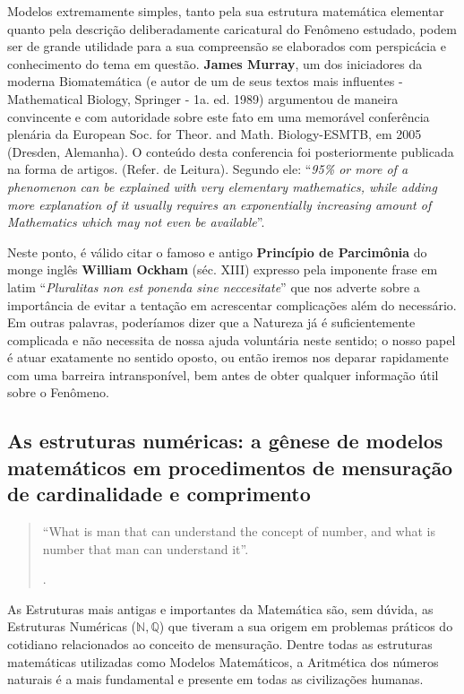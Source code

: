     Modelos extremamente simples, tanto pela sua estrutura matemática elementar quanto pela descrição deliberadamente caricatural do Fenômeno estudado, podem ser de grande utilidade para a sua compreensão se elaborados com perspicácia e conhecimento do tema em questão. \textbf{James Murray}, um dos iniciadores da moderna Biomatemática (e autor de um de seus textos mais influentes - Mathematical Biology, Springer - 1a. ed. 1989) argumentou de maneira convincente e com autoridade sobre este fato em uma memorável conferência plenária da European Soc. for Theor. and Math. Biology-ESMTB, em 2005 (Dresden, Alemanha). O conteúdo desta conferencia foi posteriormente publicada na forma de artigos. (Refer. de Leitura). Segundo ele: ``\textit{95\% or more of a phenomenon can be explained with very elementary mathematics, while adding more explanation of it usually requires an exponentially increasing amount of Mathematics which may not even be available}''.

    Neste ponto, é válido citar o famoso e antigo \textbf{Princípio de Parcimônia} do monge inglês \textbf{William Ockham} (séc. XIII) expresso pela imponente frase em latim ``\textit{Pluralitas non est ponenda sine neccesitate}'' que nos adverte sobre a importância de evitar a tentação em acrescentar complicações além do necessário. Em outras palavras, poderíamos dizer que a Natureza já é suficientemente complicada e não necessita de nossa ajuda voluntária neste sentido; o nosso papel é atuar exatamente no sentido oposto, ou então iremos nos deparar rapidamente com uma barreira intransponível, bem antes de obter qualquer informação útil sobre o Fenômeno.


\subsection{As estruturas numéricas: a gênese de modelos matemáticos em procedimentos de mensuração de cardinalidade e comprimento}

\begin{quote}
    ``What is man that can understand the concept of number, and what is number that man can understand it''.

    .
\end{quote}


    As Estruturas mais antigas e importantes da Matemática são, sem dúvida, as Estruturas Numéricas (\(\mathbb{N}, \mathbb{Q}\)) que tiveram a sua origem em problemas práticos do cotidiano relacionados ao conceito de mensuração. Dentre todas as estruturas matemáticas utilizadas como Modelos Matemáticos, a Aritmética dos números naturais é a mais fundamental e presente em todas as civilizações humanas.

